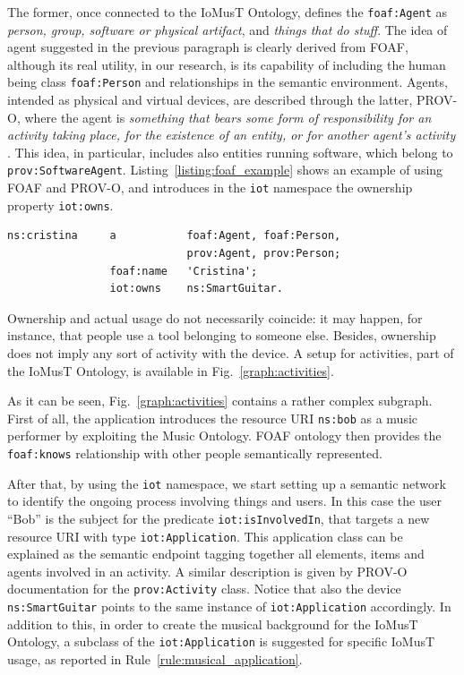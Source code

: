 The former, once connected to the IoMusT Ontology, defines the \texttt{foaf:Agent} as \textit{person, group, software or physical artifact}, and \textit{things that do stuff}. The idea of agent suggested in the previous paragraph is clearly derived from FOAF, although its real utility, in our research, is its capability of including the human being class \texttt{foaf:Person} and relationships in the semantic environment. Agents, intended as physical and virtual devices, are described through the latter, PROV-O, where the agent is \textit{something that bears some form of responsibility for an activity taking place, for the existence of an entity, or for another agent's activity} \cite{lebo2013prov}. This idea, in particular, includes also entities running software, which belong to \texttt{prov:SoftwareAgent}. Listing~\ref{listing:foaf_example} shows an example of using FOAF and PROV-O, and introduces in the \texttt{iot} namespace the ownership property \texttt{iot:owns}. 
\begin{lstlisting}[caption={FOAF \& PROV-O integration with the IoMusT Ontology. Extended prefixes are available in Table~\ref{tab:prefixes}.}, label={listing:foaf_example}]
ns:cristina     a   		foaf:Agent, foaf:Person, 
                    		prov:Agent, prov:Person;
                foaf:name 	'Cristina';
                iot:owns  	ns:SmartGuitar.
\end{lstlisting}
Ownership and actual usage do not necessarily coincide: it may happen, for instance, that people use a tool belonging to someone else. Besides, ownership does not imply any sort of activity with the device. A setup for activities, part of the IoMusT Ontology, is available in Fig.~\ref{graph:activities}.



As it can be seen, Fig.~\ref{graph:activities} contains a rather complex subgraph. First of all, the application introduces the resource URI \texttt{ns:bob} as a music performer by exploiting the Music Ontology. FOAF ontology then provides the \texttt{foaf:knows} relationship with other people semantically represented.

After that, by using the \texttt{iot} namespace, we start setting up a semantic network to identify the ongoing process involving things and users. In this case the user  ``Bob'' is the subject for the predicate \texttt{iot:isInvolvedIn}, that targets a new resource URI with type \texttt{iot:Application}. This application class can be explained as the semantic endpoint tagging together all elements, items and agents involved in an activity. A similar description is given by PROV-O documentation for the \texttt{prov:Activity} class. Notice that also the device \texttt{ns:SmartGuitar} points to the same instance of \texttt{iot:Application} accordingly. In addition to this, in order to create the musical background for the IoMusT Ontology, a subclass of the \texttt{iot:Application} is suggested for specific IoMusT usage, as reported in Rule~\ref{rule:musical_application}.


